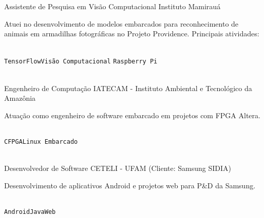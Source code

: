 \documentclass[10pt]{developercv}
\begin{document}
\begin{entrylist}
  {Assistente de Pesquisa em Visão Computacional}
  {Instituto Mamirauá}
  {
    Atuei no desenvolvimento de modelos embarcados para reconhecimento de
animais em armadilhas fotográficas no Projeto Providence. Principais
atividades:\\
    \begin{contributionlist}
    \end{contributionlist}\\
\texttt{TensorFlow}\slashsep\texttt{Visão Computacional}
\slashsep\texttt {Raspberry Pi}}\\


  {Engenheiro de Computação}
  {IATECAM - Instituto Ambiental e Tecnológico da Amazônia}
  {
  Atuação como engenheiro de software embarcado em projetos com FPGA Altera.
    \begin{contributionlist}
    \end{contributionlist}\\
\texttt{C}\slashsep\texttt{FPGA}\slashsep\texttt{Linux Embarcado}}
\\

  {Desenvolvedor de Software}
  {CETELI - UFAM (Cliente: Samsung SIDIA)}
  {
  Desenvolvimento de aplicativos Android e projetos web para P\&D da Samsung.
    \begin{contributionlist}
    \end{contributionlist}\\
\texttt{Android}\slashsep\texttt{Java}\slashsep\texttt{Web}} \\


\end{entrylist}
\end{document}
